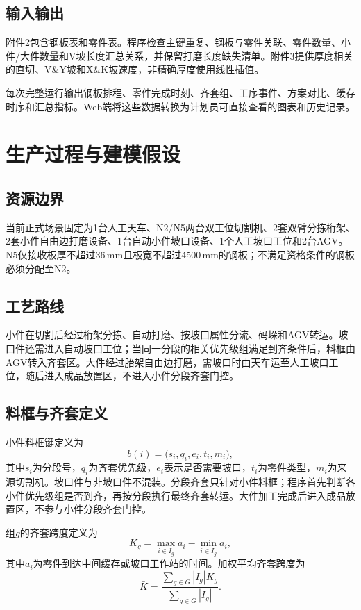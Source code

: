 \documentclass[UTF8,zihao=-4,openany]{ctexrep}
\begin{document}
\section{输入输出}

附件2包含钢板表和零件表。程序检查主键重复、钢板与零件关联、零件数量、小件/大件数量和V坡长度汇总关系，并保留打磨长度缺失清单。附件3提供厚度相关的直切、V\&Y坡和X\&K坡速度，非精确厚度使用线性插值。

每次完整运行输出钢板排程、零件完成时刻、齐套组、工序事件、方案对比、缓存时序和汇总指标。Web端将这些数据转换为计划员可直接查看的图表和历史记录。

\chapter{生产过程与建模假设}

\section{资源边界}

当前正式场景固定为1台人工天车、N2/N5两台双工位切割机、2套双臂分拣桁架、2套小件自由边打磨设备、1台自动小件坡口设备、1个人工坡口工位和2台AGV。N5仅接收板厚不超过36\,mm且板宽不超过4500\,mm的钢板；不满足资格条件的钢板必须分配至N2。

\section{工艺路线}

小件在切割后经过桁架分拣、自动打磨、按坡口属性分流、码垛和AGV转运。坡口件还需进入自动坡口工位；当同一分段的相关优先级组满足到齐条件后，料框由AGV转入齐套区。大件经过胎架自由边打磨，需坡口时由天车运至人工坡口工位，随后进入成品放置区，不进入小件分段齐套门控。

\section{料框与齐套定义}

小件料框键定义为
\begin{equation}
 b(i)=\bigl(s_i,q_i,e_i,t_i,m_i\bigr),
\end{equation}
其中$s_i$为分段号，$q_i$为齐套优先级，$e_i$表示是否需要坡口，$t_i$为零件类型，$m_i$为来源切割机。坡口件与非坡口件不混装。分段齐套只针对小件料框；程序首先判断各小件优先级组是否到齐，再按分段执行最终齐套转运。大件加工完成后进入成品放置区，不参与小件分段齐套门控。

组$g$的齐套跨度定义为
\begin{equation}
 K_g=\max_{i\in I_g}a_i-\min_{i\in I_g}a_i,
\end{equation}
其中$a_i$为零件到达中间缓存或坡口工作站的时间。加权平均齐套跨度为
\begin{equation}
 \bar K=\frac{\sum_{g\in G}|I_g|K_g}{\sum_{g\in G}|I_g|}.
\end{equation}
\end{document}
